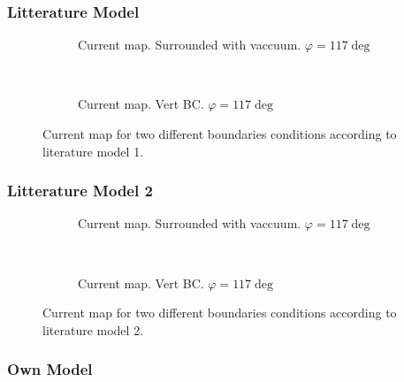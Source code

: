 \documentclass[../main.tex]{subfiles}
\begin{document}
\subsubsection{Litterature Model}
\begin{figure}[H]
    \begin{subfigure}{0.4\textwidth}
        \centering
        
        \caption{Current map. Surrounded with vaccuum. $\varphi = 117 \deg$}
        \label{fig:first}
    \end{subfigure}\\
\begin{subfigure}{0.4\textwidth}
    \centering
    
    \caption{Current map. Vert BC. $\varphi = 117 \deg$}
    \label{fig:first}
\end{subfigure}

\caption{Current map for two different boundaries conditions according to literature model 1.}
\end{figure}

\subsubsection{Litterature Model 2}
\begin{figure}[H]
    \begin{subfigure}{0.4\textwidth}
        \centering
        
        \caption{Current map. Surrounded with vaccuum. $\varphi = 117 \deg$}
        \label{fig:first}
    \end{subfigure}\\
\begin{subfigure}{0.4\textwidth}
    \centering
    
    \caption{Current map. Vert BC. $\varphi = 117 \deg$}
    \label{fig:first}
\end{subfigure}
\caption{Current map for two different boundaries conditions according to literature model 2.}
\end{figure}

\subsubsection{Own Model}
\end{document}
